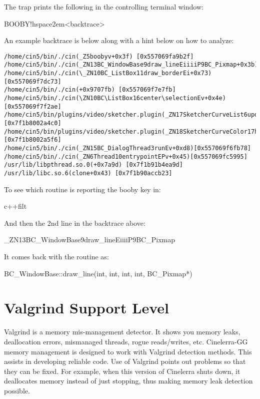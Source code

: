 The trap prints the following in the controlling terminal window:
\medskip

\hspace{2em}BOOBY!hspace{2em}{\textless}backtrace{\textgreater}
\medskip

An example backtrace is below along with a hint below on how to analyze:

\begin{lstlisting}[numbers=none]
/home/cin5/bin/./cin(_Z5boobyv+0x3f) [0x557069fa9b2f] /home/cin5/bin/./cin(_ZN13BC_WindowBase9draw_lineEiiiiP9BC_Pixmap+0x3b)0x557069fb9a9b]
/home/cin5/bin/./cin(\_ZN10BC_ListBox11draw_borderEi+0x73)[0x557069f7dc73]
/home/cin5/bin/./cin(+0x9707fb) [0x557069f7e7fb]
/home/cin5/bin/./cin(\ZN10BC\ListBox16center\selectionEv+0x4e)[0x557069f7f2ae]
/home/cin5/bin/plugins/video/sketcher.plugin(_ZN17SketcherCurveList6updateEi+0x1a0)[0x7f1b8002a4c0]
/home/cin5/bin/plugins/video/sketcher.plugin(_ZN18SketcherCurveColor17handle_done_eventEi+0x76)[0x7f1b8002a5f6]
/home/cin5/bin/./cin(_ZN15BC_DialogThread3runEv+0xd8)[0x557069f6fb78]
/home/cin5/bin/./cin(_ZN6Thread10entrypointEPv+0x45)[0x557069fc5995]
/usr/lib/libpthread.so.0(+0x7a9d) [0x7f1b91b4ea9d]
/usr/lib/libc.so.6(clone+0x43) [0x7f1b90accb23]
\end{lstlisting}

To see which routine is reporting the booby key in:
\smallskip

\hspace{2em}c++filt
\smallskip

And then the 2nd line in the backtrace above:
\smallskip

\hspace{2em}\_ZN13BC\_WindowBase9draw\_lineEiiiiP9BC\_Pixmap
\smallskip

It comes back with the routine as:
\smallskip

\hspace{2em}BC\_WindowBase::draw\_line(int, int, int, int, BC\_Pixmap*)
\medskip

\section{Valgrind Support Level}
\label{sec:Valgrind Support Level}

Valgrind is a memory mis-management detector.  It shows you memory leaks, deallocation errors, mismanaged threads, rogue reads/writes, etc.  Cinelerra-GG memory management is designed to work with Valgrind detection methods.  This assists in developing reliable code.  Use of Valgrind points out problems so that they can be fixed.  For example, when this version of Cinelerra shuts down, it deallocates memory instead of just stopping, thus making memory leak detection possible.
\medskip


